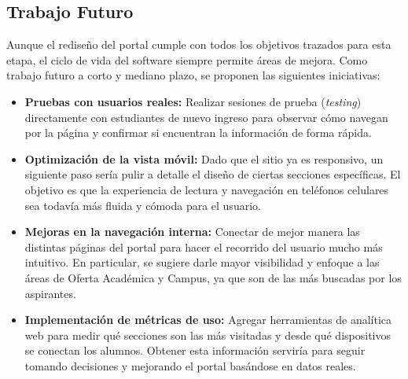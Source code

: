 \subsection{Trabajo Futuro}

Aunque el rediseño del portal cumple con todos los objetivos trazados para esta etapa, el ciclo de vida del software siempre permite áreas de mejora. Como trabajo futuro a corto y mediano plazo, se proponen las siguientes iniciativas:

\begin{itemize}
    \item \textbf{Pruebas con usuarios reales:} Realizar sesiones de prueba (\textit{testing}) directamente con estudiantes de nuevo ingreso para observar cómo navegan por la página y confirmar si encuentran la información de forma rápida.
    \item \textbf{Optimización de la vista móvil:} Dado que el sitio ya es responsivo, un siguiente paso sería pulir a detalle el diseño de ciertas secciones específicas. El objetivo es que la experiencia de lectura y navegación en teléfonos celulares sea todavía más fluida y cómoda para el usuario.
    \item \textbf{Mejoras en la navegación interna:} Conectar de mejor manera las distintas páginas del portal para hacer el recorrido del usuario mucho más intuitivo. En particular, se sugiere darle mayor visibilidad y enfoque a las áreas de Oferta Académica y Campus, ya que son de las más buscadas por los aspirantes.
    \item \textbf{Implementación de métricas de uso:} Agregar herramientas de analítica web para medir qué secciones son las más visitadas y desde qué dispositivos se conectan los alumnos. Obtener esta información serviría para seguir tomando decisiones y mejorando el portal basándose en datos reales.
\end{itemize}